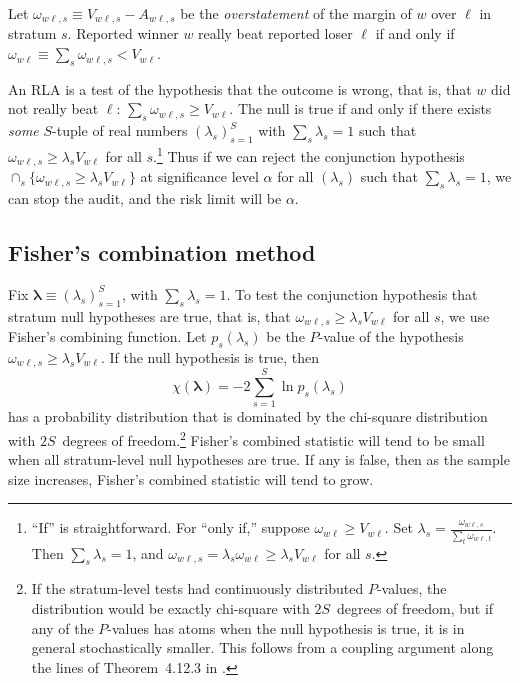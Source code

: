 \documentclass[runningheads]{llncs}
\newcommand{\beq}{\begin{equation}}
\newcommand{\eeq}{\end{equation}}
\begin{document}
Let $\omega_{w\ell,s} \equiv V_{w\ell,s} - A_{w\ell,s}$ be the \emph{overstatement}
of the margin of $w$ over $\ell$ in stratum $s$.
Reported winner $w$ really beat reported loser 
$\ell$ if and only if $\omega_{w\ell} \equiv \sum_s \omega_{w\ell,s} < V_{w\ell}$.

An RLA is a test of the hypothesis that the outcome is wrong, that is, that $w$ did not really beat $\ell$:
$\sum_s \omega_{w\ell, s} \ge V_{w\ell}$.
The null is true if and only if there exists \textit{some} $S$-tuple of real numbers $(\lambda_s)_{s=1}^S$ with $\sum_s \lambda_s = 1$ such that $\omega_{w\ell, s} \ge \lambda_s V_{w\ell}$ for all $s$.\footnote{%
  ``If'' is straightforward. For ``only if,'' suppose $\omega_{w\ell} \ge V_{w\ell}$. Set $\lambda_s = \frac{\omega_{w\ell, s}}{\sum_t \omega_{w\ell, t}}$. Then $\sum_s \lambda_s = 1$, and $\omega_{w\ell, s} = \lambda_s \omega_{w\ell} \ge \lambda_s V_{w\ell}$ for all $s$.
}
Thus if we can reject the conjunction hypothesis $\cap_s \{ \omega_{w\ell,s} \ge \lambda_s V_{w\ell} \}$ at significance level $\alpha$ for all $(\lambda_s)$ such that $\sum_s \lambda_s = 1$, we can stop the audit, and the risk limit will be $\alpha$.

\subsection{Fisher's combination method}

Fix $\mathbf{\lambda} \equiv (\lambda_s)_{s=1}^S$, with $\sum_s \lambda_s = 1$.
To test the conjunction hypothesis that stratum null hypotheses are true, that is, that $\omega_{w\ell,s} \ge \lambda_s V_{w\ell}$ for all $s$, we use Fisher's combining function.
Let $p_s(\lambda_s)$ be the $P$-value of the hypothesis $\omega_{w\ell,s} \ge \lambda_s V_{w\ell}$.
If the null hypothesis is true, then 
\beq \label{eq:fisher}
   \chi(\mathbf{\lambda}) = -2 \sum_{s=1}^S \ln p_s(\lambda_s)
\eeq
has a probability distribution that is dominated by the chi-square distribution with $2S$~degrees
of freedom.\footnote{%
   If the stratum-level tests had continuously distributed $P$-values, the distribution would be exactly
   chi-square with $2S$~degrees of freedom, but if any of the $P$-values has atoms when
   the null hypothesis is true, it is in general stochastically smaller.
   This follows from a coupling argument along the lines of Theorem~4.12.3 in \cite{grimmett01}.
}
Fisher's combined statistic will tend to be small when all stratum-level null hypotheses are true.
If any is false, then as the sample size increases, Fisher's combined statistic will tend to grow.
\end{document}
